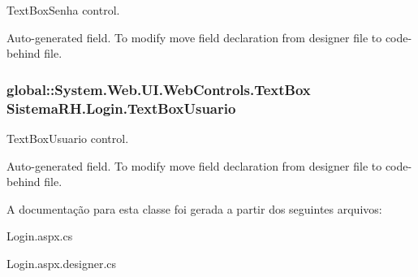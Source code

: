 TextBoxSenha control. 

Auto-\/generated field. To modify move field declaration from designer file to code-\/behind file. \hypertarget{class_sistema_r_h_1_1_login_a7689b3371502c69760e345cf3b03841b}{
\subsubsection[{TextBoxUsuario}]{\setlength{\rightskip}{0pt plus 5cm}global::System.Web.UI.WebControls.TextBox {\bf SistemaRH.Login.TextBoxUsuario}}}
\label{class_sistema_r_h_1_1_login_a7689b3371502c69760e345cf3b03841b}


TextBoxUsuario control. 

Auto-\/generated field. To modify move field declaration from designer file to code-\/behind file. 

A documentação para esta classe foi gerada a partir dos seguintes arquivos:\begin{DoxyCompactItemize}
\item 
Login.aspx.cs\item 
Login.aspx.designer.cs\end{DoxyCompactItemize}
